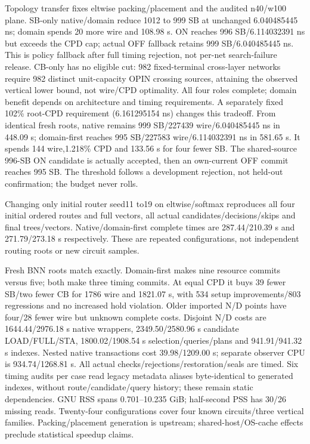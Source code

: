 \documentclass[conference,10pt]{IEEEtran}
\begin{document}
Topology transfer fixes eltwise packing/placement and the audited n40/w100 plane. SB-only native/domain reduce 1012 to 999 SB at unchanged 6.040485445 ns; domain spends 20 more wire and 108.98 s. ON reaches 996 SB/6.114032391 ns but exceeds the CPD cap; actual OFF fallback retains 999 SB/6.040485445 ns. This is policy fallback after full timing rejection, not per-net search-failure release. CB-only has no eligible cut: 982 fixed-terminal cross-layer networks require 982 distinct unit-capacity OPIN crossing sources, attaining the observed vertical lower bound, not wire/CPD optimality. All four roles complete; domain benefit depends on architecture and timing requirements. A separately fixed 102\% root-CPD requirement (6.161295154 ns) changes this tradeoff. From identical fresh roots, native remains 999 SB/227439 wire/6.040485445 ns in 448.09 s; domain-first reaches 995 SB/227583 wire/6.114032391 ns in 581.65 s. It spends 144 wire,1.218\% CPD and 133.56 s for four fewer SB. The shared-source 996-SB ON candidate is actually accepted, then an own-current OFF commit reaches 995 SB. The threshold follows a development rejection, not held-out confirmation; the budget never rolls.

Changing only initial router seed11 to19 on eltwise/softmax reproduces all four initial ordered routes and full vectors, all actual candidates/decisions/skips and final trees/vectors. Native/domain-first complete times are 287.44/210.39 s and 271.79/273.18 s respectively. These are repeated configurations, not independent routing roots or new circuit samples.

Fresh BNN roots match exactly. Domain-first makes nine resource commits versus five; both make three timing commits. At equal CPD it buys 39 fewer SB/two fewer CB for 1786 wire and 1821.07 s, with 534 setup improvements/803 regressions and no increased hold violation. Older imported N/D points have four/28 fewer wire but unknown complete costs. Disjoint N/D costs are 1644.44/2976.18 s native wrappers, 2349.50/2580.96 s candidate LOAD/FULL/STA, 1800.02/1908.54 s selection/queries/plans and 941.91/941.32 s indexes. Nested native transactions cost 39.98/1209.00 s; separate observer CPU is 934.74/1268.81 s. All actual checks/rejections/restoration/seals are timed. Six timing audits per case read legacy metadata aliases byte-identical to generated indexes, without route/candidate/query history; these remain static dependencies. GNU RSS spans 0.701--10.235 GiB; half-second PSS has 30/26 missing reads. Twenty-four configurations cover four known circuits/three vertical families. Packing/placement generation is upstream; shared-host/OS-cache effects preclude statistical speedup claims.
\end{document}
